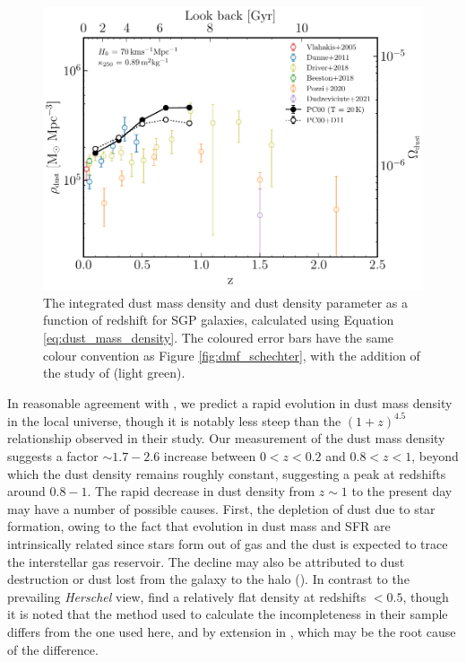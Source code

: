 \begin{figure}
	\centering
	\includegraphics[width=0.75\columnwidth]{Figures/dmd.pdf}
	\caption[Integrated dust mass density as a function of redshift]{The integrated dust mass density and dust density parameter as a function of redshift for SGP galaxies, calculated using Equation \ref{eq:dust_mass_density}. The coloured error bars have the same colour convention as Figure \ref{fig:dmf_schechter}, with the addition of the study of \citealt{Driver_2018} (light green).}
	\label{fig:dmd}
\end{figure}

In reasonable agreement with \citealt{Dunne_2011}, we predict a rapid evolution in dust mass density in the local universe, though it is notably less steep than the $(1+z)^{4.5}$ relationship observed in their study. Our measurement of the dust mass density suggests a factor $\sim 1.7 - 2.6$ increase between $0 < z < 0.2$ and $0.8 < z < 1$, beyond which the dust density remains roughly constant, suggesting a peak at redshifts around $0.8 - 1$. The rapid decrease in dust density from $z \sim 1$ to the present day may have a number of possible causes. First, the depletion of dust due to star formation, owing to the fact that evolution in dust mass and SFR are intrinsically related since stars form out of gas and the dust is expected to trace the interstellar gas reservoir. The decline may also be attributed to dust destruction or dust lost from the galaxy to the halo (\citealt{Dunne_2011}). In contrast to the prevailing \textit{Herschel} view, \citealt{Driver_2018} find a relatively flat density at redshifts $< 0.5$, though it is noted that the method used to calculate the incompleteness in their sample differs from the one used here, and by extension in \citealt{Dunne_2011}, which may be the root cause of the difference.

